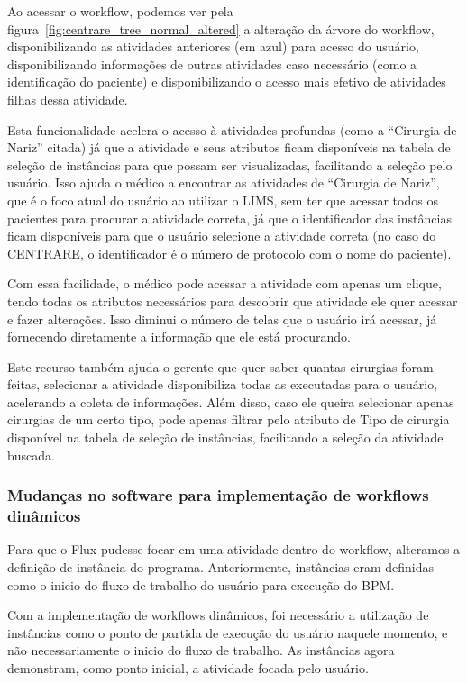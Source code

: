 Ao acessar o workflow, podemos ver pela figura~\ref{fig:centrare_tree_normal_altered} a alteração da árvore do workflow, disponibilizando as atividades anteriores (em azul) para acesso do usuário, disponibilizando informações de outras atividades caso necessário (como a identificação do paciente) e disponibilizando o acesso mais efetivo de atividades filhas dessa atividade.

Esta funcionalidade acelera o acesso à atividades profundas (como a ``Cirurgia de Nariz'' citada) já que a atividade e seus atributos ficam disponíveis na tabela de seleção de instâncias para que possam ser visualizadas, facilitando a seleção pelo usuário. Isso ajuda o médico a encontrar as atividades de ``Cirurgia de Nariz'', que é o foco atual do usuário ao utilizar o LIMS, sem ter que acessar todos os pacientes para procurar a atividade correta, já que o identificador das instâncias ficam disponíveis para que o usuário selecione a atividade correta (no caso do CENTRARE, o identificador é o número de protocolo com o nome do paciente).

Com essa facilidade, o médico pode acessar a atividade com apenas um clique, tendo todas os atributos necessários para descobrir que atividade ele quer acessar e fazer alterações. Isso diminui o número de telas que o usuário irá acessar, já fornecendo diretamente a informação que ele está procurando.

Este recurso também ajuda o gerente que quer saber quantas cirurgias foram feitas, selecionar a atividade disponibiliza todas as executadas para o usuário, acelerando a coleta de informações. Além disso, caso ele queira selecionar apenas cirurgias de um certo tipo, pode apenas filtrar pelo atributo de Tipo de cirurgia disponível na tabela de seleção de instâncias, facilitando a seleção da atividade buscada.

\subsubsection{Mudanças no software para implementação de workflows dinâmicos}

Para que o Flux pudesse focar em uma atividade dentro do workflow, alteramos a definição de instância do programa. Anteriormente, instâncias eram definidas como o inicio do fluxo de trabalho do usuário para execução do BPM.

Com a implementação de workflows dinâmicos, foi necessário a utilização de instâncias como o ponto de partida de execução do usuário naquele momento, e não necessariamente o inicio do fluxo de trabalho. As instâncias agora demonstram, como ponto inicial, a atividade focada pelo usuário.

